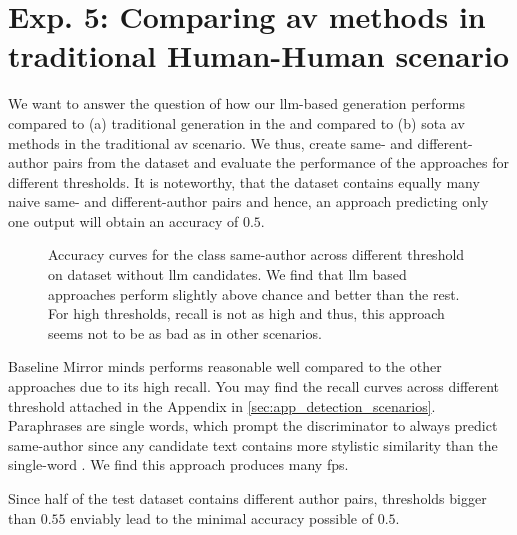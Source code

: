 \section{Exp. 5: Comparing \acs{av} methods in traditional Human-Human scenario}

We want to answer the question of how our \ac{llm}-based \imp{} generation performs compared to (a) traditional \imp{} generation in the \impAppr{} and compared to (b) \ac{sota} \ac{av} methods in the traditional \ac{av} scenario.
We thus, create same- and different-author pairs from the \dataStudent{} dataset and evaluate the performance of the approaches for different thresholds.
It is noteworthy, that the dataset contains equally many naive same- and different-author pairs and hence, an approach predicting only one output will obtain an accuracy of $0.5$.

\begin{figure}[htbp]
\centering
    
  \caption{Accuracy curves for the class same-author across different threshold on \dataStudent{} dataset without \ac{llm} candidates. We find that \ac{llm} based approaches perform slightly above chance and better than the rest. For high thresholds, recall is not as high and thus, this approach seems not to be as bad as in other scenarios. 
  }
  \label{fig:human-human_acc}
\end{figure}

Baseline Mirror minds performs reasonable well compared to the other approaches due to its high recall.
You may find the recall curves across different threshold attached in the Appendix in \autoref{sec:app_detection_scenarios}.
Paraphrases are single words, which prompt the discriminator to always predict same-author since any candidate text contains more stylistic similarity than the single-word \imps{}.
We find this approach produces many \acp{fp}.


Since half of the test dataset contains different author pairs, thresholds bigger than $0.55$ enviably lead to the minimal accuracy possible of $0.5$.

%     


%     
